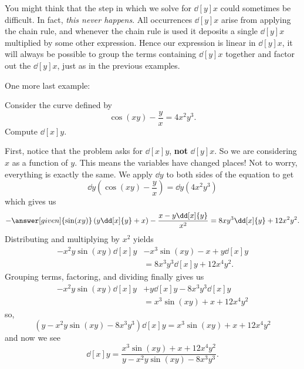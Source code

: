 \documentclass{ximera}
\begin{document}
\begin{example}
\begin{explanation}
\begin{image}
\end{image}
\end{explanation}

\end{example}


You might think that the step in which we solve for $\dd[y]{x}$ could
sometimes be difficult. In fact, \textit{this never happens}. All
occurrences $\dd[y]{x}$ arise from applying the chain rule, and
whenever the chain rule is used it deposits a single $\dd[y]{x}$
multiplied by some other expression. Hence our expression is linear in
$\dd[y]{x}$, it will always be possible to group the terms containing
$\dd[y]{x}$ together and factor out the $\dd[y]{x}$, just as in the
previous examples.

One more last example:

\begin{example}
Consider the curve defined by
\[
\cos(xy) - \frac{y}{x} = 4x^2 y^3.
\]
Compute $\dd[x]{y}$.
\begin{explanation}
First, notice that the problem asks for $\dd[x]{y}$, \textbf{not}
$\dd[y]{x}$.  So we are considering $x$ as a function of $y$. This
means the variables have changed places!  Not to worry, everything is
exactly the same.  We apply $\dd{y}$ to both sides of the equation to
get
\[
\dd{y} \left( \cos(xy) - \frac{y}{x} \right) = \dd{y} (4x^2 y^3)
\]
which gives us
\[
-\answer[given]{\sin(xy)} \left(y \dd[x]{y} + x \right) - \frac{x - y \dd[x]{y}}{x^2}
= 8xy^3 \dd[x]{y} + 12 x^2 y^2.
\]
Distributing and multiplying by $x^2$ yields
\begin{align*}
  -x^2 y \sin(xy) \dd[x]{y} &- x^3 \sin(xy) - x + y \dd[x]{y}\\
  &= 8x^3y^3 \dd[x]{y} + 12x^4y^2.
\end{align*}
Grouping terms, factoring, and dividing finally gives us
\begin{align*}
  -x^2 y \sin(xy) \dd[x]{y} &+ y \dd[x]{y} - 8x^3y^3 \dd[x]{y} \\
  &= x^3 \sin(xy) + x + 12x^4 y^2
\end{align*}
so,
\[
\left( y - x^2y\sin(xy) - 8x^3 y^3 \right) \dd[x]{y} = x^3 \sin(xy) + x + 12x^4 y^2 
\]
and now we see
\[
\dd[x]{y} = \frac{x^3 \sin(xy) + x + 12x^4 y^2}{y - x^2y\sin(xy) - 8x^3 y^3}.
\]
\end{explanation}
\end{example}
\end{document}
